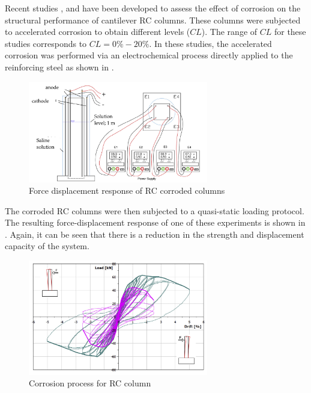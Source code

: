 Recent studies \cite{Ma2012}, \cite{Meda2014} and \cite{Yang2016} have been developed to assess the effect of corrosion on the structural performance of cantilever RC columns. These columns were subjected to accelerated corrosion to obtain different levels ($CL$). The range of $CL$ for these studies corresponds to $CL=0\%-20\%$. In these studies, the accelerated corrosion was performed via an electrochemical process directly applied to the reinforcing steel as shown in .

\begin{figure}[htbp]
	\centering
	\includegraphics[width=0.7\textwidth]{Chapter-3/figs/Meda_Corrosion}
	\caption{Force displacement response of RC corroded columns \cite{Meda2014}}
	\label{fig:Meda_RC_CorrosionProc}
\end{figure}

The corroded RC columns were then subjected to a quasi-static loading protocol. The resulting force-displacement response of one of these experiments is shown in . Again, it can be seen that there is a reduction in the strength and displacement capacity of the system. 

\begin{figure}[htbp]
	\centering
	\includegraphics[width=0.7\textwidth]{Chapter-3/figs/Meda_F-D_01}
	\caption{Corrosion process for RC column \cite{Meda2014}}
	\label{fig:Meda_FD}
\end{figure}

